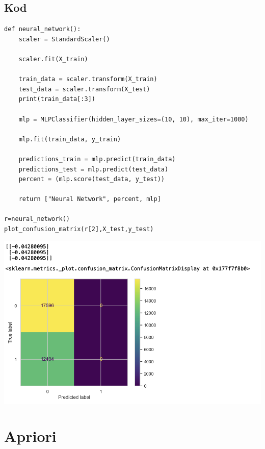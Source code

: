 \documentclass{article}
\begin{document}
{\subsection{Kod}
\begin{lstlisting}
def neural_network():
    scaler = StandardScaler()

    scaler.fit(X_train)

    train_data = scaler.transform(X_train)
    test_data = scaler.transform(X_test)
    print(train_data[:3])

    mlp = MLPClassifier(hidden_layer_sizes=(10, 10), max_iter=1000)

    mlp.fit(train_data, y_train)

    predictions_train = mlp.predict(train_data)
    predictions_test = mlp.predict(test_data)
    percent = (mlp.score(test_data, y_test))

    return ["Neural Network", percent, mlp]

r=neural_network()
plot_confusion_matrix(r[2],X_test,y_test)
\end{lstlisting}

    \begin{center}
    \includegraphics[width=1.0\textwidth]{image12.png}\newline
\end{center}
\newpage
\section{\LARGE{Apriori}}
}
\end{document}
